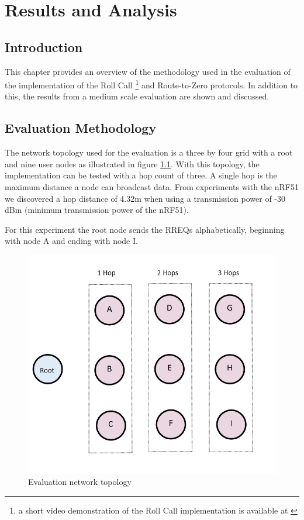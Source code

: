 \chapter{Results and Analysis}

    \section{Introduction}
    This chapter provides an overview of the methodology used in the evaluation
    of the implementation of the Roll Call \footnote{a short video demonstration of the Roll
    Call implementation is available at \cite{rc_demo}} and Route-to-Zero protocols. In addition to this, the
    results from a medium scale evaluation are shown and
    discussed.

    \section{Evaluation Methodology}
    The network topology used for the evaluation is a three by four grid with
    a root and nine user nodes as illustrated in figure \ref{fig:test_topology}. With this
    topology, the implementation can be tested with a hop count of three. A single hop
    is the maximum distance a node can broadcast data. From experiments with
    the nRF51 we discovered a hop distance of 4.32m when using a transmission
    power of -30 dBm (minimum transmission power of the nRF51).

    For this experiment the root node sends the RREQs alphabetically, beginning with
    node A and ending with node I.

    \FloatBarrier
    \begin{figure}[ht]
      \includegraphics[scale=0.75]{Images/chapter5/setup.png}
      \caption{Evaluation network topology}
      \label{fig:test_topology}
    \end{figure}
    \FloatBarrier

